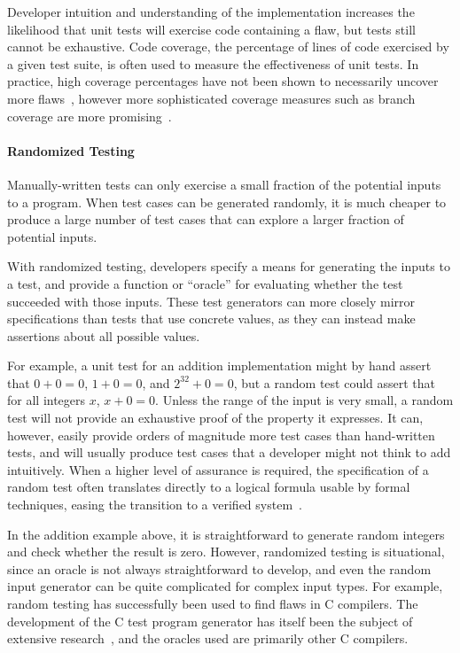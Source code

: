Developer intuition and understanding of the implementation increases
the likelihood that unit tests will exercise code containing a flaw,
but tests still cannot be exhaustive. Code coverage, the percentage of
lines of code exercised by a given test suite, is often used to
measure the effectiveness of unit tests. In practice, high coverage
percentages have not been shown to necessarily uncover more
flaws~\cite{inozemtseva2014coverage}, however more sophisticated
coverage measures such as branch coverage are more
promising~\cite{gligoric2013comparing}.

\paragraph{Randomized Testing}

Manually-written tests can only exercise a small fraction of the
potential inputs to a program. When test cases can be generated
randomly, it is much cheaper to produce a large number of test cases
that can explore a larger fraction of potential inputs.

With randomized testing, developers specify a means for generating the
inputs to a test, and provide a function or ``oracle'' for evaluating
whether the test succeeded with those inputs. These test generators
can more closely mirror specifications than tests that use concrete
values, as they can instead make assertions about all possible
values.

For example, a unit test for an addition implementation might by hand
assert that $0+0=0$, $1+0=0$, and $2^{32}+0=0$, but a random test
could assert that for all integers $x$, $x+0=0$. Unless the range of
the input is very small, a random test will not provide an exhaustive
proof of the property it expresses. It can, however, easily provide
orders of magnitude more test cases than hand-written tests, and will
usually produce test cases that a developer might not think to add
intuitively. When a higher level of assurance is required, the
specification of a random test often translates directly to a logical
formula usable by formal techniques, easing the transition to a
verified system~\cite{swierstra2012xmonad}.

In the addition example above, it is straightforward to generate
random integers and check whether the result is zero. However,
randomized testing is situational, since an oracle is not always
straightforward to develop, and even the random input generator can be
quite complicated for complex input types. For example, random testing
has successfully been used to find flaws in C compilers. The
development of the C test program generator has itself been the
subject of extensive research~\cite{yang2011finding}, and the oracles
used are primarily other C compilers.

